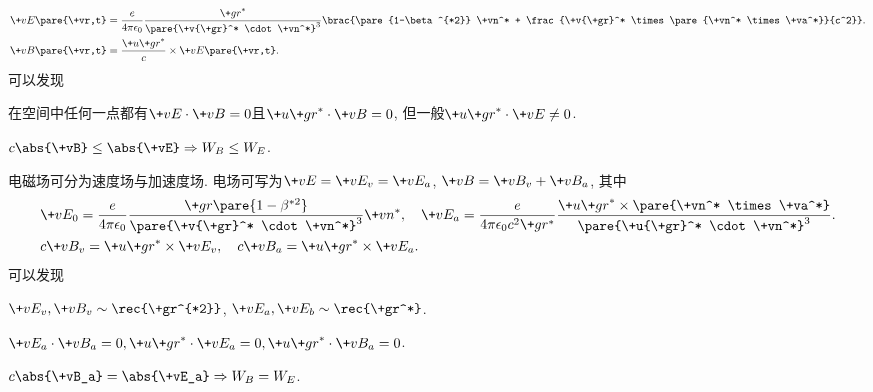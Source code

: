 \documentclass[hidelinks]{ctexart}
\begin{document}
\vspace{-\baselineskip}
    \begin{align*}
        \+vE\pare{\+vr,t} &= \frac{e}{4\pi\epsilon_0}\frac{{\+gr}^*}{\pare{\+v{\+gr}^* \cdot \+vn^*}^3}\brac{\pare{1-\beta^{*2}} \+vn^* + \frac{\+v{\+gr}^* \times \pare{\+vn^* \times \+va^*}}{c^2}}. \\
        \+vB\pare{\+vr,t} &= \frac{\+u{\+gr}^*}{c}\times \+vE\pare{\+vr,t}.
    \end{align*}
可以发现
\begin{cenum}
    \item 在空间中任何一点都有$\+vE\cdot \+vB = 0$且$\+u{\+gr}^* \cdot \+vB = 0$, 但一般$\+u{\+gr}^*\cdot \+vE \neq 0$.
    \item $c\abs{\+vB} \le \abs{\+vE} \Rightarrow W_B \le W_E$.
    \item 电磁场可分为速度场与加速度场. 电场可写为$\+vE = \+vE_v = \+vE_a$, $\+vB = \+vB_v + \+vB_a$, 其中
    \begin{align*}
        & \+vE_0 = \frac{e}{4\pi\epsilon_0}\frac{\+gr\pare{1-\beta^{*2}}}{\pare{\+v{\+gr}^* \cdot \+vn^*}^3}\+vn^*,\quad \+vE_a = \frac{e}{4\pi\epsilon_0 c^2 \+gr^*} \frac{\+u{\+gr}^* \times \pare{\+vn^* \times \+va^*}}{\pare{\+u{\+gr}^* \cdot \+vn^*}^3}. \\
        & c\+vB_v = \+u{\+gr}^* \times \+vE_v,\quad c\+vB_a = \+u{\+gr}^*\times \+vE_a.
    \end{align*}
    可以发现
    \begin{cenum}
        \item $\displaystyle \+vE_v, \+vB_v \sim \rec{\+gr^{*2}}$, $\displaystyle \+vE_a,\+vE_b \sim \rec{\+gr^*}$.
        \item $\+vE_a\cdot \+vB_a = 0, \+u{\+gr}^* \cdot \+vE_a = 0, \+u{\+gr}^*\cdot \+vB_a = 0$.
        \item $c\abs{\+vB_a} = \abs{\+vE_a} \Rightarrow W_B = W_E$.
    \end{cenum}
\end{cenum}
\end{document}
